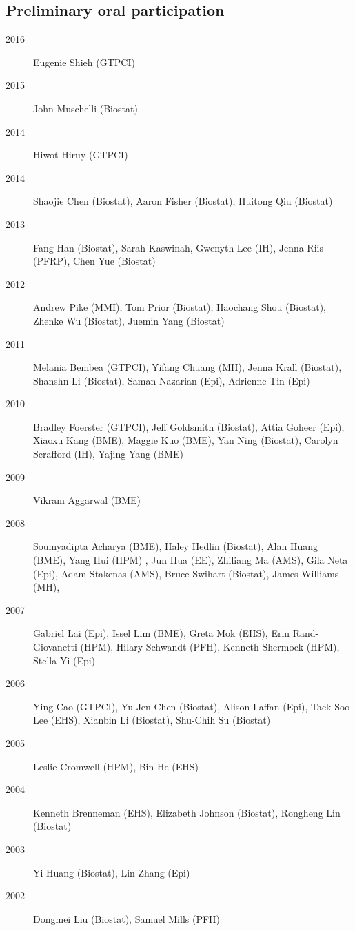 \documentclass[12pt]{article}
\begin{document}
\subsection*{Preliminary oral participation}
\begin{description}
\item[\textnormal{2016}] Eugenie Shieh (GTPCI)
\item[\textnormal{2015}] John Muschelli (Biostat)
\item[\textnormal{2014}] Hiwot Hiruy (GTPCI)
\item[\textnormal{2014}] Shaojie Chen (Biostat), Aaron Fisher (Biostat), Huitong Qiu (Biostat) 
\item[\textnormal{2013}] Fang Han (Biostat), Sarah Kaswinah, Gwenyth Lee (IH), Jenna Riis (PFRP), Chen Yue (Biostat)
\item[\textnormal{2012}] Andrew Pike (MMI), Tom Prior (Biostat), Haochang Shou (Biostat), Zhenke Wu (Biostat), Juemin Yang (Biostat)
\item[\textnormal{2011}] Melania Bembea (GTPCI), Yifang Chuang (MH), Jenna Krall (Biostat), Shanshn Li (Biostat), Saman Nazarian (Epi), Adrienne Tin (Epi)
\item[\textnormal{2010}] Bradley Foerster (GTPCI), Jeff Goldsmith (Biostat), Attia Goheer (Epi), Xiaoxu Kang (BME), Maggie Kuo (BME), Yan Ning (Biostat),  Carolyn Scrafford (IH), Yajing Yang (BME)
\item[\textnormal{2009}] Vikram Aggarwal (BME)
\item[\textnormal{2008}] Soumyadipta Acharya (BME), Haley Hedlin (Biostat), Alan Huang (BME), Yang Hui (HPM) , 
Jun Hua (EE),  Zhiliang Ma (AMS),  Gila Neta (Epi), Adam Stakenas (AMS), Bruce Swihart (Biostat), James Williams (MH),  
\item[\textnormal{2007}] Gabriel Lai (Epi), Issel Lim (BME), Greta Mok (EHS), Erin Rand-Giovanetti (HPM), Hilary Schwandt (PFH),  Kenneth Shermock (HPM), Stella Yi (Epi) 
\item[\textnormal{2006}] Ying Cao (GTPCI), Yu-Jen Chen (Biostat), Alison Laffan (Epi), Taek Soo Lee (EHS), Xianbin 
Li (Biostat), Shu-Chih Su (Biostat) 
\item[\textnormal{2005}] Leslie Cromwell (HPM), Bin He (EHS) 
\item[\textnormal{2004}] Kenneth Brenneman (EHS), Elizabeth Johnson (Biostat), Rongheng Lin (Biostat)
\item[\textnormal{2003}] Yi Huang (Biostat), Lin Zhang (Epi) 
\item[\textnormal{2002}] Dongmei Liu (Biostat), Samuel Mills (PFH)  
\end{description}
\end{document}
